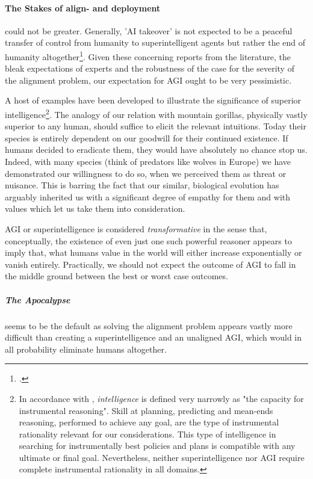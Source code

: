 \documentclass[12pt, a4paper]{article}
\begin{document}
		\paragraph[Relevance of cognitive abilities]{The Stakes of align- and deployment }
			could not be greater.
			Generally, 'AI takeover' is not expected to be a peaceful transfer of control from humanity to superintelligent agents but rather the end of humanity altogether\footcite{mclean2021risks}.
			Given these concerning reports from the literature, the bleak expectations of experts and the robustness of the case for the severity of the alignment problem, our expectation for AGI ought to be very pessimistic.
			
			A host of examples have been developed to illustrate the significance of superior intelligence\footnote{In accordance with \textcite{bostrom2014superintelligence}, \textit{intelligence} is defined very narrowly as "the capacity for instrumental reasoning". Skill at planning, predicting and mean-ends reasoning, performed to achieve any goal, are the type of instrumental rationality relevant for our considerations. This type of intelligence in searching for instrumentally best policies and plans is compatible with any ultimate or final goal. Nevertheless, neither superintelligence nor AGI require complete instrumental rationality in all domains.}.
			The analogy of our relation with mountain gorillas, physically vastly superior to any human, should suffice to elicit the relevant intuitions.
			Today their species is entirely dependent on our goodwill for their continued existence.
			If humans decided to eradicate them, they would have absolutely no chance stop us.
			Indeed, with many species (think of predators like wolves in Europe) we have demonstrated our willingness to do so, when we perceived them as threat or nuisance.
			This is barring the fact that our similar, biological evolution has arguably inherited us with a significant degree of empathy for them and with values which let us take them into consideration.

			AGI or superintelligence is considered \textit{transformative} in the sense that, conceptually, the existence of even just one such powerful reasoner appears to imply that, what humans value in the world will either increase exponentially or vanish entirely.
			Practically, we should not expect the outcome of AGI to fall in the middle ground between the best or worst case outcomes.
			
			\subparagraph[Failed alignment]{The Apocalypse}
				seems to be the default as solving the alignment problem appears vastly more difficult than creating a superintelligence and an unaligned AGI, which would in all probability eliminate humans altogether.
			
\end{document}
